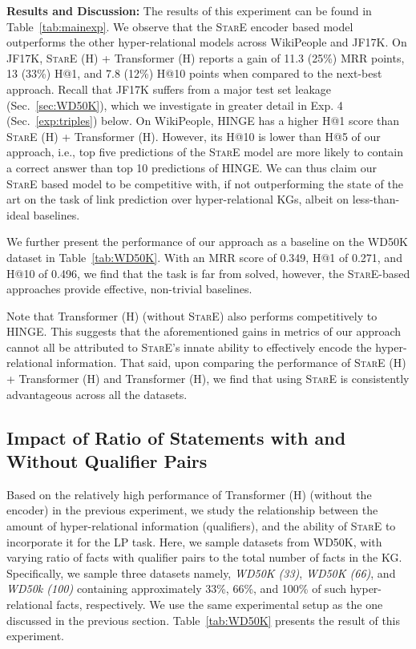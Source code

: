 \documentclass[11pt,a4paper]{article}
\begin{document}
\textbf{Results and Discussion:} 
The results of this experiment can be found in Table~\ref{tab:mainexp}.
We observe that the \textsc{StarE}  encoder based model outperforms the other hyper-relational models across  WikiPeople and JF17K.
On JF17K, \textsc{StarE} (H) + Transformer (H) reports a gain of 11.3 (25\%) MRR points, 13 (33\%) H@1, and 7.8 (12\%) H@10 points when compared to the next-best approach.
Recall that JF17K suffers from a major test set leakage (Sec.~\ref{sec:WD50K}), which we investigate in greater detail in Exp. 4 (Sec.~\ref{exp:triples}) below. On WikiPeople, HINGE has a higher H@1 score than \textsc{StarE} (H) + Transformer (H). However, its H@10 is lower than H@5 of our approach, i.e., top five predictions of the \textsc{StarE} model are more likely to contain a correct answer than top 10 predictions of HINGE. We can thus claim our \textsc{StarE} based model to be competitive with, if not outperforming  the state of the art on the task of link prediction over hyper-relational KGs, albeit on less-than-ideal baselines.


We further present the performance of our approach as a  baseline on the WD50K dataset in Table~\ref{tab:WD50K}. With an MRR score of 0.349, H@1 of 0.271, and H@10 of 0.496, we find that the task is far from solved, 
however, the \textsc{StarE}-based approaches provide effective, non-trivial baselines. 

Note that Transformer (H) (without \textsc{StarE}) also performs competitively to HINGE. This suggests that the aforementioned gains in metrics of our approach 
cannot all be attributed to \textsc{StarE}'s innate ability to effectively encode the hyper-relational information. That said, upon comparing the performance of \textsc{StarE} (H) + Transformer (H) and Transformer (H), we find that using \textsc{StarE} is consistently advantageous across all the datasets. 


\subsection{Impact of Ratio of Statements with and Without Qualifier Pairs}
\label{exp:quals}

Based on the relatively high performance of Transformer (H) (without the encoder) in the previous experiment,  we study the relationship between the amount of hyper-relational information (qualifiers), and the ability of \textsc{StarE} to incorporate it for the LP task. 
Here, we sample datasets from WD50K, with varying ratio of facts with qualifier pairs to the total number of facts in the KG.
Specifically, we sample three datasets namely, \emph{WD50K (33)}, \emph{WD50K (66)}, and \emph{WD50k (100)} containing approximately 33\%, 66\%, and 100\% of such hyper-relational facts, respectively. We use the same experimental setup as the one discussed in the previous section. Table~\ref{tab:WD50K} presents the result of this experiment. 
\end{document}
